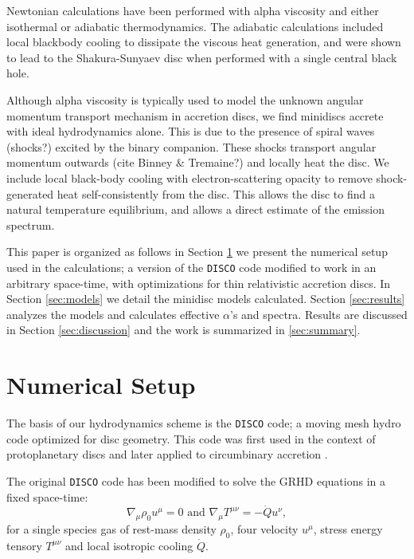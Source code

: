 \documentclass{emulateapj}
\newcommand{\DISCO}{{\texttt{DISCO}}}
\begin{document}
Newtonian calculations have been performed with alpha viscosity and either isothermal \citep{Farris14} or adiabatic \citep{Farris15A, Farris15B} thermodynamics. The adiabatic calculations included local blackbody cooling to dissipate the
viscous heat generation, and were shown to lead to the Shakura-Sunyaev disc
when performed with a single central black hole.

Although alpha viscosity is typically used to model the unknown angular 
momentum transport mechanism in accretion discs, we find minidiscs accrete with
ideal hydrodynamics alone.  This is due to the presence of spiral waves (shocks?) excited by the binary companion. These shocks transport angular momentum outwards (cite Binney \& Tremaine?) and locally heat the disc. We include local 
black-body cooling with electron-scattering opacity to remove shock-generated
heat self-consistently from the disc.  This allows the disc to find a natural
temperature equilibrium, and allows a direct estimate of the emission spectrum.

This paper is organized as follows in Section \ref{sec:numerics} we present the
numerical setup used in the calculations; a version of the \DISCO{} code 
modified to work in an arbitrary space-time, with optimizations for thin 
relativistic accretion discs.  In Section \ref{sec:models} we detail the 
minidisc models calculated.  Section \ref{sec:results} analyzes the models and
calculates effective $\alpha$'s and spectra. Results are discussed in Section \ref{sec:discussion} and the work is summarized in \ref{sec:summary}.


\section{Numerical Setup}
\label{sec:numerics}

The basis of our hydrodynamics scheme is the \DISCO{} code; a moving mesh hydro
code optimized for disc geometry. This code was first used in the context of
protoplanetary discs \citep{Duffell12, Duffell13, Duffell14} and later applied 
to circumbinary accretion \citep{Farris14, Farris15A, Farris15B}. 

The original \DISCO{} code has been modified to solve the GRHD equations in a 
fixed space-time:
\begin{equation}
    \nabla_\mu \rho_0 u^\mu = 0 \text{ and } \nabla_\mu T^{\mu\nu} = -\dot{Q} u^\nu , \label{eq:GRHD}
\end{equation}
for a single species gas of rest-mass density $\rho_0$, four velocity $u^\mu$, 
stress energy tensory $T^{\mu\nu}$ and local isotropic cooling $\dot{Q}$.  
\end{document}
